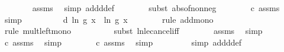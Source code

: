\begin{isabellebody}
\ \ \ \ \ \ \isamarkupfalse%
\ assms{\isacharparenleft}{\kern0pt}{}{\isacharparenright}{\kern0pt}\ \isamarkupfalse%
\ {\isacharparenleft}{\kern0pt}simp\ add{\isacharcolon}{\kern0pt}d{\isacharunderscore}{\kern0pt}def{\isacharparenright}{\kern0pt}\isanewline
\ \ \ \ \ \ \isamarkupfalse%
\ {\isacharparenleft}{\kern0pt}subst\ abs{\isacharunderscore}{\kern0pt}of{\isacharunderscore}{\kern0pt}nonneg{\isacharparenright}{\kern0pt}\isanewline
\ \ \ \ \ \ \isamarkupfalse%
\ c\ assms{\isacharparenleft}{\kern0pt}{}{\isacharparenright}{\kern0pt}\ \isamarkupfalse%
\ simp{\isacharplus}{\kern0pt}\isanewline
\ \ \ \ \isamarkupfalse%
\ \isamarkupfalse%
\ {\isachardoublequoteopen}{\isachardot}{\kern0pt}{\isachardot}{\kern0pt}{\isachardot}{\kern0pt}\ {\isasymle}\ {\isacharparenleft}{\kern0pt}d{\isacharminus}{\kern0pt}{}{\isacharparenright}{\kern0pt}{\isacharasterisk}{\kern0pt}\ ln\ {\isacharparenleft}{\kern0pt}g\ x{\isacharparenright}{\kern0pt}\ {\isacharplus}{\kern0pt}\ ln\ {\isacharparenleft}{\kern0pt}g\ x{\isacharparenright}{\kern0pt}{\isachardoublequoteclose}\isanewline
\ \ \ \ \ \ \isamarkupfalse%
\ {\isacharparenleft}{\kern0pt}rule\ add{\isacharunderscore}{\kern0pt}mono{\isacharparenright}{\kern0pt}\isanewline
\ \ \ \ \ \ \ \isamarkupfalse%
\ {\isacharparenleft}{\kern0pt}rule\ mult{\isacharunderscore}{\kern0pt}left{\isacharunderscore}{\kern0pt}mono{\isacharparenright}{\kern0pt}\isanewline
\ \ \ \ \ \ \ \ \isamarkupfalse%
\ {\isacharparenleft}{\kern0pt}subst\ ln{\isacharunderscore}{\kern0pt}le{\isacharunderscore}{\kern0pt}cancel{\isacharunderscore}{\kern0pt}iff{\isacharparenright}{\kern0pt}\isanewline
\ \ \ \ \ \ \isamarkupfalse%
\ assms{\isacharparenleft}{\kern0pt}{}{\isacharparenright}{\kern0pt}\ \isamarkupfalse%
\ simp\isanewline
\ \ \ \ \ \ \isamarkupfalse%
\ c\ assms{\isacharparenleft}{\kern0pt}{}{\isacharparenright}{\kern0pt}\ \isamarkupfalse%
\ simp\isanewline
\ \ \ \ \ \ \isamarkupfalse%
\ c\ assms{\isacharparenleft}{\kern0pt}{}{\isacharparenright}{\kern0pt}\ \isamarkupfalse%
\ simp\isanewline
\ \ \ \ \ \ \ \isamarkupfalse%
\ {\isacharparenleft}{\kern0pt}simp\ add{\isacharcolon}{\kern0pt}d{\isacharunderscore}{\kern0pt}def{\isacharparenright}{\kern0pt}\isanewline
\ \ \ \ \ \ \ \isamarkupfalse%

\end{isabellebody}
